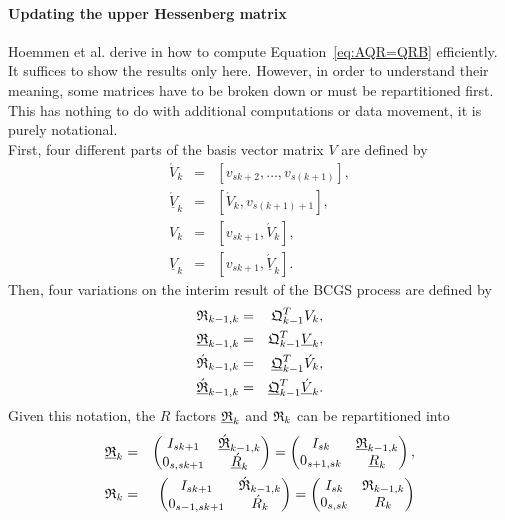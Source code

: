 \documentclass{scrartcl}
\numberwithin{equation}{section}
\begin{document}
\paragraph{Updating the upper Hessenberg matrix}
Hoemmen et al. derive in \cite{Hoemmen:2010:CKS:1970638} how to compute Equation~\eqref{eq:AQR=QRB} efficiently. It suffices to show the results only here.
However, in order to understand their meaning, some matrices have to be broken down or must be repartitioned first. This has nothing to do with additional computations or data movement, it is purely notational.\\

First, four different parts of the basis vector matrix $V$ are defined by
\begin{eqnarray*}
\acute{V}_k &=& [v_{sk + 2}, \ldots, v_{s(k + 1)}],\\
\underline{\acute{V}}_k &=& [\acute{V}_k, v_{s(k + 1) + 1}],\\
V_k &=& [v_{sk + 1}, \acute{V}_k],\\
\underline{V}_k &=& [v_{sk + 1}, \underline{\acute{V}}_k].
\end{eqnarray*}
Then, four variations on the interim result of the BCGS process are defined by
\begin{eqnarray*}
	\frak{R}_{k - 1, k} &=& \frak{Q}_{k - 1}^TV_k,\\
	\underline{\frak{R}}_{k - 1, k} &=& \frak{Q}_{k - 1}^T\underline{V}_k,\\
	\frak{\acute{R}}_{k - 1, k} &=& \underline{\frak{Q}}_{k - 1}^T\acute{V}_k,\\
	\underline{\frak{\acute{R}}}_{k - 1, k} &=& \underline{\frak{Q}}_{k - 1}^T\underline{\acute{V}}_k.
\end{eqnarray*}
Given this notation, the $R$ factors $\underline{\frak{R}}_k$ and $\frak{R}_k$ can be repartitioned into
\begin{eqnarray*}
\underline{\frak{R}}_k &=&
\begin{pmatrix}
	I_{sk + 1} & \underline{\acute{\frak{R}}}_{k - 1, k} \\
	0_{s, sk + 1} & \underline{\acute{R}}_k \\
\end{pmatrix} = 
\begin{pmatrix}
	I_{sk} & \underline{\frak{R}}_{k - 1, k} \\
	0_{s + 1, sk} & \underline{R}_k \\
\end{pmatrix}, \\
\frak{R}_k &=&
\begin{pmatrix}
	I_{sk + 1} & \acute{\frak{R}}_{k - 1, k} \\
	0_{s - 1, sk + 1} & \acute{R}_k \\
\end{pmatrix} = 
\begin{pmatrix}
	I_{sk} & \frak{R}_{k - 1, k} \\
	0_{s, sk} & R_k \\
\end{pmatrix}
\end{eqnarray*}
\end{document}
